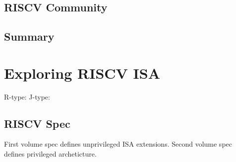 \documentclass[10pt,a4paper]{article}
\begin{document}
    \subsection{RISCV Community}
    \subsection{Summary}
\section{Exploring RISCV ISA}
    R-type:
    J-type:

    \subsection{RISCV Spec}
      First volume spec defines unprivileged ISA extensions. Second volume spec defines privileged archeticture.
\end{document}
